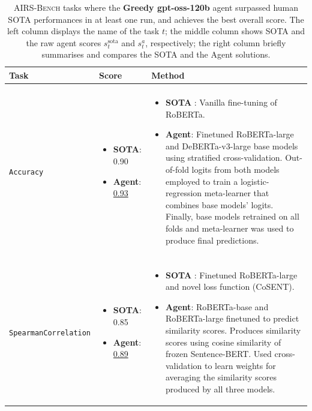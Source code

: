 \documentclass{fairmeta}
\newcommand{\airsbench}{\textsc{AIRS-Bench}}
\begin{document}
\begin{table}[htbp]
\centering
\footnotesize
\begin{tabularx}{\textwidth}{p{} p{} X}
\toprule
\rowcolor{headerfaintorange}
\textbf{Task} & \textbf{Score} & \textbf{Method} \\
\midrule

\makecell[l]{\texttt{TextualClassificationSick-}\\\texttt{Accuracy}} &
\begin{itemize}[nosep,leftmargin=*]
    \item \textbf{SOTA}: 0.90
    \item \textbf{Agent}: \underline{0.93}
\end{itemize} &
\begin{itemize}[nosep,leftmargin=*]
    \item \textbf{SOTA} \citep{kalouli2023curing}: Vanilla fine-tuning of RoBERTa.
    \item \textbf{Agent}: Finetuned RoBERTa-large and DeBERTa-v3-large base models using stratified cross-validation.
    Out-of-fold logits from both models employed to train a logistic-regression meta-learner that combines base models' logits. Finally, base models retrained on all folds and meta-learner was used to produce final predictions.
\end{itemize} \\
\midrule

\makecell[l]{\texttt{TextualSimilaritySick-}\\\texttt{SpearmanCorrelation}} &
\begin{itemize}[nosep,leftmargin=*]
    \item \textbf{SOTA}: 0.85
    \item \textbf{Agent}: \underline{0.89}
\end{itemize} &
\begin{itemize}[nosep,leftmargin=*]
    \item \textbf{SOTA} \citep{huang2024cosent}: Finetuned RoBERTa-large and novel loss function (CoSENT).
    \item \textbf{Agent}: RoBERTa-base and RoBERTa-large finetuned to predict similarity scores. Produces similarity scores using cosine similarity of frozen Sentence-BERT. Used cross-validation to learn weights for averaging the similarity scores produced by all three models.
\end{itemize} \\

\bottomrule
\end{tabularx}

\caption{\airsbench{} tasks where the \textbf{Greedy gpt-oss-120b} agent surpassed human SOTA performances in at least one run, and achieves the best overall score. The left column displays the name of the task $t$; the middle column shows SOTA and the raw agent scores $s^\mathrm{sota}_t$ and $s_t^a$, respectively; the right column briefly summarises and compares the SOTA and the Agent solutions.}
\label{tab:beat-sota-greedygptoss120b}

\end{table}
\end{document}
